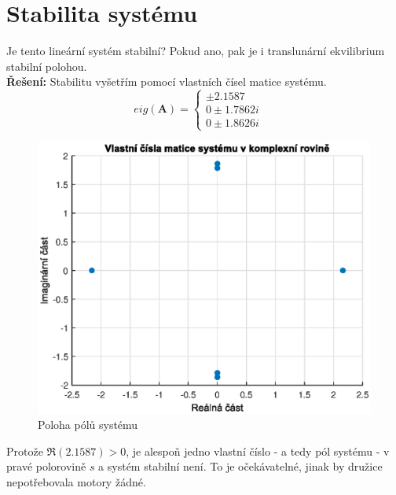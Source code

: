 \documentclass[twoside]{article}
\begin{document}
\section{Stabilita systému}
\label{sec:ukol1}
Je tento lineární systém stabilní? Pokud ano, pak je i translunární ekvilibrium stabilní polohou. \\
\textbf{Řešení:}
Stabilitu vyšetřím pomocí vlastních čísel matice systému.
\begin{equation*}
	eig(\mathbf{A}) =
	\begin{cases}
		\pm 2.1587 & \\
		0 \pm 1.7862i & \\
		0 \pm 1.8626i \ &
	\end{cases}
\end{equation*}
\begin{figure}[hbtp]
	\centering
	\includegraphics{vlastni_cisla.eps}
	\caption{Poloha pólů systému}
	\label{fig:vlastni_cisla}
\end{figure}
Protože $\Re(2.1587) > 0$, je alespoň jedno vlastní číslo - a tedy pól systému - v pravé polorovině $s$ a systém stabilní není.
To je očekávatelné, jinak by družice nepotřebovala motory žádné. 
\end{document}
